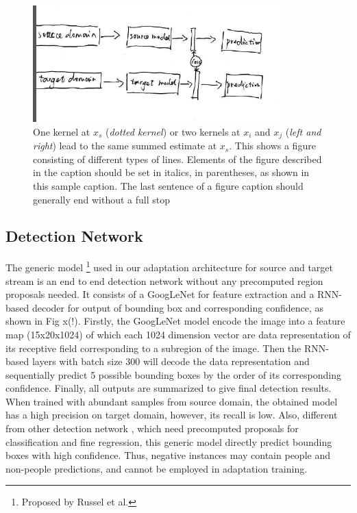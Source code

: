 \documentclass[runningheads]{llncs}
\begin{document}
\begin{figure}
\centering
\includegraphics[height=4.5cm]{images/streams.png}
\caption{One kernel at $x_s$ ({\it dotted kernel}) or two kernels at
$x_i$ and $x_j$ ({\it left and right}) lead to the same summed estimate
at $x_s$. This shows a figure consisting of different types of
lines. Elements of the figure described in the caption should be set in
italics,
in parentheses, as shown in this sample caption. The last
sentence of a figure caption should generally end without a full stop}
\label{fig:example}
\end{figure}

\subsection{Detection Network}
\label{section:Detection Network}
The generic model \footnote{Proposed by Russel et al.} used in our adaptation architecture for source and target stream is an end to end detection network without any precomputed region proposals needed. It consists of a GoogLeNet \cite{szegedy2015going} for feature extraction and a RNN-based decoder for output of bounding box and corresponding confidence, as shown in Fig x(!). Firstly, the GoogLeNet model encode the image into a feature map (15x20x1024) of which each 1024 dimension vector are data representation of its receptive field corresponding to a subregion of the image. Then the RNN-based layers with batch size 300 will decode the data representation and sequentially predict 5 possible bounding boxes by the order of its corresponding confidence. Finally, all outputs are summarized to give final detection results. When trained with abundant samples from source domain, the obtained model has a high precision on target domain, however, its recall is low. Also, different from other detection network \cite{girshick2015fast,vu2015context}, which need precomputed proposals for classification and fine regression, this generic model directly predict bounding boxes with high confidence. Thus, negative instances may contain people and non-people predictions, and cannot be employed in adaptation training.
\end{document}
